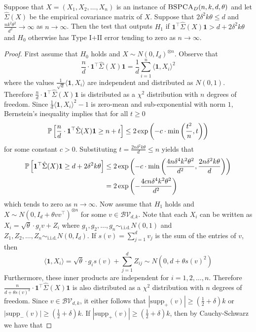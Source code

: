 \begin{theorem} \label{thm:bspcadet}
Suppose that $X = (X_1, X_2, \dots, X_n)$ is an instance of $\textsc{BSPCA}_D(n, k, d, \theta)$ and let $\hat{\Sigma}(X)$ be the empirical covariance matrix of $X$. Suppose that $2 \delta^2 k \theta \le d$ and $\frac{n k^2 \theta^2}{d^2} \to \infty$ as $n \to \infty$. Then the test that outputs $H_1$ if $\mathbf{1}^\top \hat{\Sigma}(X) \mathbf{1} > d + 2\delta^2 k \theta$ and $H_0$ otherwise has Type I$+$II error tending to zero as $n \to \infty$.
\end{theorem}

\begin{proof}
First assume that $H_0$ holds and $X \sim N(0, I_d)^{\otimes n}$. Observe that
$$\frac{n}{d} \cdot \mathbf{1}^\top \hat{\Sigma}(X) \mathbf{1} = \frac{1}{d}\sum_{i = 1}^n \langle \mathbf{1}, X_i \rangle^2$$
where the values $\frac{1}{\sqrt{d}} \langle \mathbf{1}, X_i \rangle$ are independent and distributed as $N(0, 1)$. Therefore $\frac{n}{d} \cdot \mathbf{1}^\top \hat{\Sigma}(X) \mathbf{1}$ is distributed as a $\chi^2$ distribution with $n$ degrees of freedom. Since $\frac{1}{d} \langle \mathbf{1}, X_i \rangle^2 - 1$ is zero-mean and sub-exponential with norm $1$, Bernstein's inequality implies that for all $t \ge 0$
$$\mathbb{P}\left[ \frac{n}{d} \cdot \mathbf{1}^\top \hat{\Sigma}(X) \mathbf{1} \ge n + t \right] \le 2 \exp\left( - c \cdot \min \left( \frac{t^2}{n}, t \right) \right)$$
for some constant $c > 0$. Substituting $t = \frac{2n \delta^2 k \theta}{d} \le n$ yields that
\begin{align*}
\mathbb{P}\left[ \mathbf{1}^\top \hat{\Sigma}(X) \mathbf{1} \ge d + 2\delta^2 k \theta \right] &\le 2 \exp\left( - c \cdot \min \left( \frac{4n \delta^4 k^2 \theta^2}{d^2}, \frac{2n \delta^2 k \theta}{d} \right) \right)\\
&= 2 \exp\left( - \frac{4cn \delta^4 k^2 \theta^2}{d^2} \right)
\end{align*}
which tends to zero as $n \to \infty$. Now assume that $H_1$ holds and $X \sim N(0, I_d + \theta vv^\top)^{\otimes n}$ for some $v \in \mathcal{BV}_{d, k}$. Note that each $X_i$ can be written as $X_i = \sqrt{\theta} \cdot g_i v + Z_i$ where $g_1, g_2, \dots, g_n \sim_{\text{i.i.d.}} N(0, 1)$ and $Z_1, Z_2, \dots, Z_n \sim_{\text{i.i.d.}} N(0, I_d)$. If $s(v) = \sum_{j = 1}^d v_j$ is the sum of the entries of $v$, then
$$\langle \mathbf{1}, X_i \rangle = \sqrt{\theta} \cdot g_i s(v) + \sum_{j = 1}^d Z_{ij} \sim N\left(0, d + \theta s(v)^2\right)$$
Furthermore, these inner products are independent for $i = 1, 2, \dots, n$. Therefore $\frac{n}{d + \theta s(v)^2} \cdot \mathbf{1}^\top \hat{\Sigma}(X) \mathbf{1}$ is also distributed as a $\chi^2$ distribution with $n$ degrees of freedom. Since $v \in \mathcal{BV}_{d, k}$, it either follows that $|\text{supp}_+(v)| \ge \left( \frac{1}{2} + \delta \right)k$ or $|\text{supp}_-(v)| \ge \left( \frac{1}{2} + \delta \right)k$. If $|\text{supp}_+(v)| \ge \left( \frac{1}{2} + \delta \right)k$, then by Cauchy-Schwarz we have that

\end{proof}
